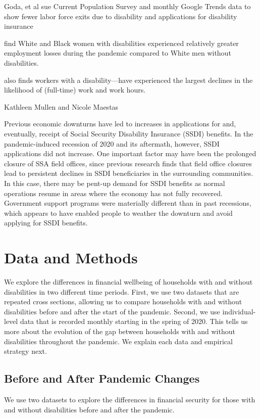 \documentclass[12pt]{article}
\begin{document}
  Goda, et al sue Current Population Survey and monthly Google Trends data to show fewer labor force exits due to disability and applications for disability insurance \citep{goda2022impact}


\citeauthor{schur2021covid} find White and Black women with disabilities experienced relatively greater employment losses during the pandemic compared to White men without disabilities. \citep{schur2021covid}

   \cite{cowan2020short} also finds workers with a disability—have experienced the largest declines in the likelihood of (full-time) work and work hours.

  
Kathleen Mullen and Nicole Maestas
 
Previous economic downturns have led to increases in applications for and, eventually, receipt of Social Security Disability Insurance (SSDI) benefits. In the pandemic-induced recession of 2020 and its aftermath, however, SSDI applications did not increase. One important factor may have been the prolonged closure of SSA field offices, since previous research finds that field office closures lead to persistent declines in SSDI beneficiaries in the surrounding communities. In this case, there may be pent-up demand for SSDI benefits as normal operations resume in areas where the economy has not fully recovered. Government support programs were materially different than in past recessions, which appears to have enabled people to weather the downturn and avoid applying for SSDI benefits. \cite{mullen2022economic}

 


 
 
\section{Data and Methods}
We explore the differences in financial wellbeing of households with and without disabilities in two different time periods. First, we use two datasets that are repeated cross sections, allowing us to compare households with and without disabilities before and after the start of the pandemic. Second, we use individual-level data that is recorded monthly starting in the spring of 2020. This tells us more about the evolution of the gap between households with and without disabilities throughout the pandemic. We explain each data and empirical strategy next. 

\subsection{Before and After Pandemic Changes}
We use two datasets to explore the differences in financial security for those with and without disabilities before and after the pandemic. 
\end{document}
